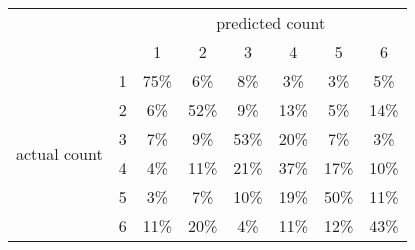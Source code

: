 
\begin{tabular}{*{8}{c}}
& & \multicolumn{6}{c}{predicted count} \\
& & 1 & 2 & 3 & 4 & 5 & 6 \\
\multirow{6}{*}{\begin{sideways}actual count\end{sideways}}
& 1 & \cellcolor[rgb]{0.000000,1.000000,0.000000}75\% & \cellcolor[rgb]{0.987315,0.012685,0.000000}6\% & \cellcolor[rgb]{0.967214,0.032786,0.000000}8\% & \cellcolor[rgb]{0.995154,0.004846,0.000000}3\% & \cellcolor[rgb]{0.996400,0.003600,0.000000}3\% & \cellcolor[rgb]{0.991856,0.008144,0.000000}5\%\\
& 2 & \cellcolor[rgb]{0.984543,0.015457,0.000000}6\% & \cellcolor[rgb]{0.000001,0.999999,0.000000}52\% & \cellcolor[rgb]{0.960568,0.039432,0.000000}9\% & \cellcolor[rgb]{0.793233,0.206767,0.000000}13\% & \cellcolor[rgb]{0.989269,0.010731,0.000000}5\% & \cellcolor[rgb]{0.754492,0.245508,0.000000}14\%\\
& 3 & \cellcolor[rgb]{0.976984,0.023016,0.000000}7\% & \cellcolor[rgb]{0.946464,0.053536,0.000000}9\% & \cellcolor[rgb]{0.000000,1.000000,0.000000}53\% & \cellcolor[rgb]{0.228780,0.771220,0.000000}20\% & \cellcolor[rgb]{0.980048,0.019952,0.000000}7\% & \cellcolor[rgb]{0.995294,0.004706,0.000000}3\%\\
& 4 & \cellcolor[rgb]{0.992536,0.007464,0.000000}4\% & \cellcolor[rgb]{0.888490,0.111510,0.000000}11\% & \cellcolor[rgb]{0.154156,0.845844,0.000000}21\% & \cellcolor[rgb]{0.000336,0.999664,0.000000}37\% & \cellcolor[rgb]{0.500333,0.499667,0.000000}17\% & \cellcolor[rgb]{0.939464,0.060536,0.000000}10\%\\
& 5 & \cellcolor[rgb]{0.995930,0.004070,0.000000}3\% & \cellcolor[rgb]{0.976984,0.023016,0.000000}7\% & \cellcolor[rgb]{0.934220,0.065780,0.000000}10\% & \cellcolor[rgb]{0.299381,0.700619,0.000000}19\% & \cellcolor[rgb]{0.000001,0.999999,0.000000}50\% & \cellcolor[rgb]{0.919415,0.080585,0.000000}11\%\\
& 6 & \cellcolor[rgb]{0.917261,0.082739,0.000000}11\% & \cellcolor[rgb]{0.217071,0.782929,0.000000}20\% & \cellcolor[rgb]{0.994473,0.005527,0.000000}4\% & \cellcolor[rgb]{0.888730,0.111270,0.000000}11\% & \cellcolor[rgb]{0.880363,0.119637,0.000000}12\% & \cellcolor[rgb]{0.000031,0.999969,0.000000}43\%\\
\end{tabular}
